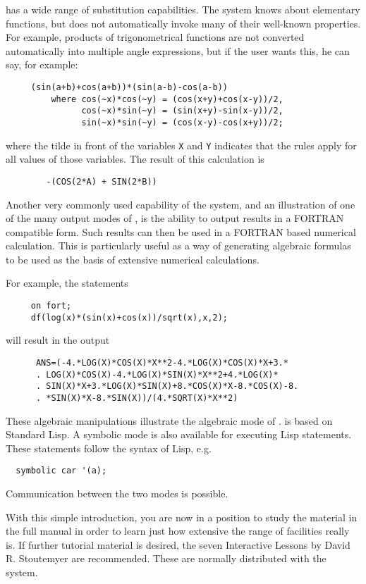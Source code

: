 {\REDUCE} has a wide range of substitution capabilities. The system knows
about elementary functions, but does not automatically invoke many of their
well-known properties. For example, products of trigonometrical functions
are not converted automatically into multiple angle expressions, but if the
user wants this, he can say, for example:
\begin{verbatim}
     (sin(a+b)+cos(a+b))*(sin(a-b)-cos(a-b))
         where cos(~x)*cos(~y) = (cos(x+y)+cos(x-y))/2,
               cos(~x)*sin(~y) = (sin(x+y)-sin(x-y))/2,
               sin(~x)*sin(~y) = (cos(x-y)-cos(x+y))/2;
\end{verbatim}
where the tilde in front of the variables {\tt X} and {\tt Y} indicates
that the rules apply for all values of those variables.
The result of this calculation is
\begin{verbatim}
        -(COS(2*A) + SIN(2*B))
\end{verbatim}
Another very commonly used capability of the system, and an illustration
of one of the many output modes of {\REDUCE}, is the ability to output
results in a FORTRAN compatible form.  Such results can then be used in a
FORTRAN based numerical calculation.  This is particularly useful as a way
of generating algebraic formulas to be used as the basis of extensive
numerical calculations.

For example, the statements
\begin{verbatim}
     on fort;
     df(log(x)*(sin(x)+cos(x))/sqrt(x),x,2);
\end{verbatim}
will result in the output
\begin{verbatim}
      ANS=(-4.*LOG(X)*COS(X)*X**2-4.*LOG(X)*COS(X)*X+3.*
      . LOG(X)*COS(X)-4.*LOG(X)*SIN(X)*X**2+4.*LOG(X)*
      . SIN(X)*X+3.*LOG(X)*SIN(X)+8.*COS(X)*X-8.*COS(X)-8.
      . *SIN(X)*X-8.*SIN(X))/(4.*SQRT(X)*X**2)
\end{verbatim}
These algebraic manipulations illustrate the algebraic mode of {\REDUCE}.
{\REDUCE} is based on Standard Lisp. A symbolic mode is also available for
executing Lisp statements. These statements follow the syntax of Lisp,
e.g.
\begin{verbatim}
  symbolic car '(a);
\end{verbatim}
Communication between the two modes is possible.

With this simple introduction, you are now in a position to study the
material in the full {\REDUCE} manual in order to learn just how extensive
the range of facilities really is.  If further tutorial material is
desired, the seven {\REDUCE} Interactive Lessons by David R. Stoutemyer are
recommended.  These are normally distributed with the system.

